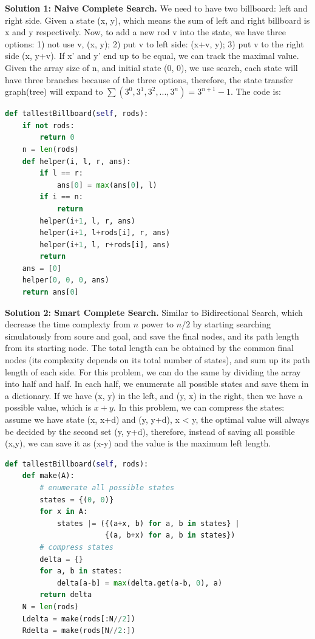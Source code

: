\documentclass[../algorithms.tex]{subfiles}
\begin{document}
\begin{examples}
\textbf{Solution 1: Naive Complete Search.} We need to have two billboard: left and right side. Given a state (x, y), which means the sum of left and right billboard is x and y respectively. Now, to add a new rod v into the state, we have three options: 1) not use v, (x, y); 2) put v to left side: (x+v, y); 3) put v to the right side (x, y+v). If x' and y' end up to be equal, we can track the maximal value. Given the array size of n, and initial state (0, 0), we use search, each state will have three branches because of the three options, therefore, the state transfer graph(tree) will expand to $\sum(3^0, 3^1, 3^2, ..., 3^{n}) = 3^{n+1}-1$. The code is:
\begin{lstlisting}[language=Python]
def tallestBillboard(self, rods):
    if not rods:
        return 0
    n = len(rods)
    def helper(i, l, r, ans):
        if l == r: 
            ans[0] = max(ans[0], l)
        if i == n:
            return
        helper(i+1, l, r, ans)
        helper(i+1, l+rods[i], r, ans)
        helper(i+1, l, r+rods[i], ans)
        return
    ans = [0]
    helper(0, 0, 0, ans)
    return ans[0]
\end{lstlisting}
\textbf{Solution 2: Smart Complete Search.} Similar to Bidirectional Search, which decrease the time complexty from $n$ power to $n/2$ by starting searching simulatously from soure and goal, and save the final nodes, and its path length from its starting node. The total length can be obtained by the common final nodes (its complexity depends on its total number of states), and sum up its path length of each side. For this problem, we can do the same by dividing the array into half and half. In each half, we enumerate all possible states and save them in a dictionary. If we have (x, y) in the left, and (y, x) in the right, then we have a possible value, which is $x+y$.  In this problem, we can compress the states: assume we have state (x, x+d) and (y, y+d), x < y, the optimal value will always be decided by the second set (y, y+d), therefore, instead of saving all possible (x,y), we can save it as (x-y) and the value is the maximum left length.  
\begin{lstlisting}[language=Python]
def tallestBillboard(self, rods):
    def make(A):
        # enumerate all possible states
        states = {(0, 0)}
        for x in A:
            states |= ({(a+x, b) for a, b in states} |
                       {(a, b+x) for a, b in states})
        # compress states
        delta = {}
        for a, b in states:
            delta[a-b] = max(delta.get(a-b, 0), a)
        return delta
    N = len(rods)
    Ldelta = make(rods[:N//2])
    Rdelta = make(rods[N//2:])


\end{lstlisting}
\end{examples}
\end{document}
